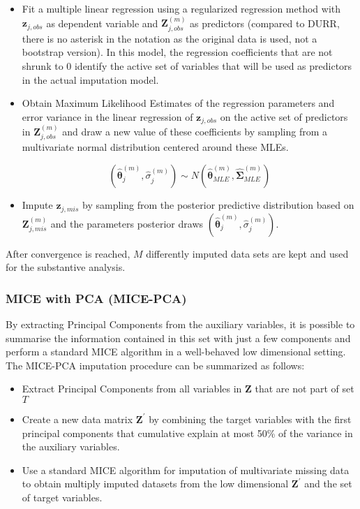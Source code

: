 	\begin{itemize}

	\item Fit a multiple linear regression using a regularized regression method with $\bm{z}_{j,obs}$ as dependent 
	 	variable and $\bm{Z}_{j,obs}^{(m)}$ as predictors 
		(compared to DURR, there is no asterisk in the notation as the original data is used, not a bootstrap 
		version).
		In this model, the regression coefficients that are not shrunk to 0 identify the active 
		set of variables that will be used as predictors in the actual imputation model.
	
	\item Obtain Maximum Likelihood Estimates of the regression parameters and error variance in the linear
		regression of $\bm{z}_{j,obs}$ on the active set of predictors in $\bm{Z}_{j,obs}^{(m)}$ and
		draw a new value of these coefficients by sampling from a multivariate normal distribution
		centered around these MLEs.

		\begin{equation}
		(\hat{\bm{\theta}}_{j}^{(m)}, \hat{\sigma}_{j}^{(m)}) \sim N(\hat{\bm{\theta}}_{MLE}^{(m)}, \hat{\bm{\Sigma}}_{MLE}^{(m)})
		\end{equation}

	\item Impute $\bm{z}_{j,mis}$ by sampling from the posterior predictive distribution based 
		on $\bm{Z}_{j,mis}^{(m)}$ and the parameters posterior draws $(\hat{\bm{\theta}}_{j}^{(m)}, 
		\hat{\sigma}_{j}^{(m)})$.

	\end{itemize}

	After convergence is reached, $M$ differently imputed data sets are kept and used for the substantive 
	analysis.

\subsubsection{MICE with PCA (MICE-PCA)}
	By extracting Principal Components from the auxiliary variables, it is possible to summarise the 
	information contained in this set with just a few components and perform a standard MICE algorithm 
	in a well-behaved low dimensional setting.
	The MICE-PCA imputation procedure can be summarized as follows:

	\begin{itemize}

	\item Extract Principal Components from all variables in $\bm{Z}$ that are not part of set $T$
	\item Create a new data matrix $\bm{Z}^{'}$ by combining the target variables with the first principal
		components that cumulative explain at most 50\% of the variance in the auxiliary variables.
	\item Use a standard MICE algorithm for imputation of multivariate missing data to obtain multiply
		imputed datasets from the low dimensional $\bm{Z}^{'}$ and the set of target variables.
	\end{itemize}

